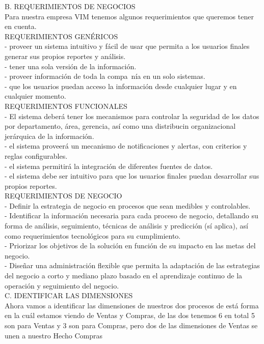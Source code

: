 \documentclass[12pt,letterpaper]{article}
\begin{document}
B.	REQUERIMIENTOS DE NEGOCIOS \\

Para nuestra empresa VIM tenemos algunos requerimientos que queremos tener en cuenta.\\

REQUERIMIENTOS GEN\'ERICOS\\
- proveer un sistema intuitivo y f\'acil de usar que permita a los usuarios finales generar sus propios reportes y an\'alisis.\\
- tener una sola versi\'on de la informaci\'on.\\
- proveer informaci\'on de toda la compa~n\'ia en un solo sistemas.\\
- que los usuarios puedan acceso la informaci\'on desde cualquier lugar y en cualquier momento.\\

REQUERIMIENTOS FUNCIONALES\\
- El sistema deber\'a tener los mecanismos para controlar la seguridad de los datos por departamento, \'area, gerencia, as\'i como una distribucin organizacional jer\'arquica de la informaci\'on.\\
- el sistema proveer\'a un mecanismo de notificaciones y alertas, con criterios y reglas configurables.\\
- el sistema permitir\'a la integraci\'on de diferentes fuentes de datos.\\
- el sistema debe ser intuitivo para que los usuarios finales puedan desarrollar sus propios reportes.\\

REQUERIMIENTOS DE NEGOCIO\\
- Definir la estrategia de negocio en procesos que sean medibles y controlables.\\
- Identificar la informaci\'on necesaria para cada proceso de negocio, detallando su forma de an\'alisis, seguimiento, t\'ecnicas de an\'alisis y predicci\'on (s\'i aplica), as\'i como requerimientos tecnol\'ogicos para su cumplimiento.\\
- Priorizar los objetivos de la soluci\'on en funci\'on de su impacto en las metas del negocio.\\
- Dise\~nar una administraci\'on flexible que permita la adaptaci\'on de las estrategias del negocio a corto y mediano plazo basado en el aprendizaje continuo de la operaci\'on y seguimiento del negocio.\\

C.	IDENTIFICAR LAS DIMENSIONES\\
Ahora vamos a identificar las dimensiones de nuestros dos procesos de est\'a forma en la cu\'al estamos viendo de Ventas y Compras, de las dos tenemos 6 en total 5 son para Ventas y 3 son para Compras, pero dos de las dimensiones de Ventas se unen a nuestro Hecho Compras\\
\end{document}
